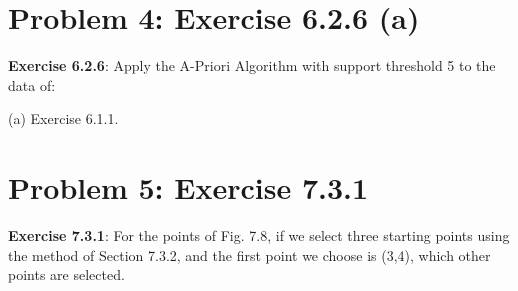 \documentclass{article}
\begin{document}
\section{Problem 4: Exercise 6.2.6 (a)}

\textbf{Exercise 6.2.6}: Apply the A-Priori Algorithm with support threshold 5 to the data of:

(a) Exercise 6.1.1.



\section{Problem 5: Exercise 7.3.1}


\textbf{Exercise 7.3.1}: For the points of Fig. 7.8, if we select three starting points using the method
of Section 7.3.2, and the first point we choose is (3,4), which other points are selected.
\end{document}
